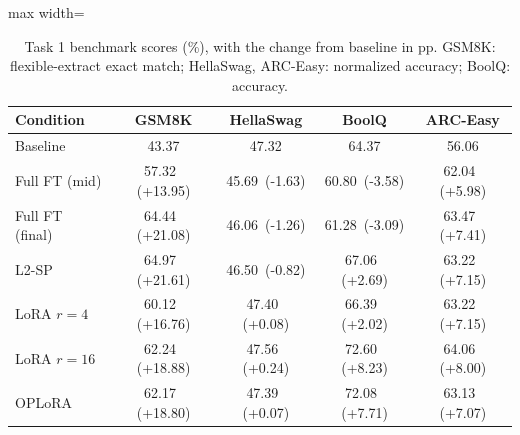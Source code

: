 \begin{table}[t]
\centering
\small
\caption{Task 1 benchmark scores (\%), with the change from baseline in pp. GSM8K: flexible-extract exact match; HellaSwag, ARC-Easy: normalized accuracy; BoolQ: accuracy.}
\label{tab:t1-benchmarks}
\begin{adjustbox}{max width=\linewidth}
\begin{tabular}{lcccc}
\toprule
Condition & GSM8K & HellaSwag & BoolQ & ARC-Easy \\
\midrule
Baseline & 43.37 & 47.32 & 64.37 & 56.06 \\
\midrule
Full FT (mid) & 57.32 \,(+13.95) & 45.69 \,(-1.63) & 60.80 \,(-3.58) & 62.04 \,(+5.98) \\
Full FT (final) & 64.44 \,(+21.08) & 46.06 \,(-1.26) & 61.28 \,(-3.09) & 63.47 \,(+7.41) \\
\midrule
L2-SP & 64.97 \,(+21.61) & 46.50 \,(-0.82) & 67.06 \,(+2.69) & 63.22 \,(+7.15) \\
LoRA $r{=}4$ & 60.12 \,(+16.76) & 47.40 \,(+0.08) & 66.39 \,(+2.02) & 63.22 \,(+7.15) \\
LoRA $r{=}16$ & 62.24 \,(+18.88) & 47.56 \,(+0.24) & 72.60 \,(+8.23) & 64.06 \,(+8.00) \\
OPLoRA & 62.17 \,(+18.80) & 47.39 \,(+0.07) & 72.08 \,(+7.71) & 63.13 \,(+7.07) \\
\bottomrule
\end{tabular}
\end{adjustbox}
\end{table}
